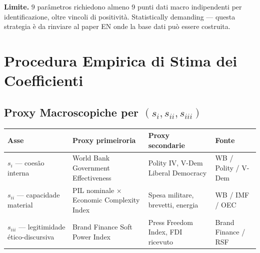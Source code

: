 \Conj{} \textbf{Limite.} \(9\) parâmetros richiedono almeno 9 punti dati
macro indipendenti per identificazione, oltre vincoli di positività.
Statistically demanding --- questa strategia è da rinviare al paper EN
onde la base dati può essere costruita.



\section{Procedura Empirica di Stima dei
Coefficienti}\label{procedura-empirica-di-stima-dei-coefficienti}

\subsection{\texorpdfstring{Proxy Macroscopiche per
\((s_i, s_{ii}, s_{iii})\)}{Proxy Macroscopiche per (s\_i, s\_\{ii\}, s\_\{iii\})}}\label{proxy-macroscopiche-per-s_i-s_ii-s_iii}

{\def\LTcaptype{none} %
{\small\begin{longtable}[]{@{}
  >{\raggedright\arraybackslash}p{}
  >{\raggedright\arraybackslash}p{}
  >{\raggedright\arraybackslash}p{}
  >{\raggedright\arraybackslash}p{}@{}}
\toprule\noalign{}
\begin{minipage}[b]{\linewidth}\raggedright
Asse
\end{minipage} & \begin{minipage}[b]{\linewidth}\raggedright
Proxy primeiroria
\end{minipage} & \begin{minipage}[b]{\linewidth}\raggedright
Proxy secondarie
\end{minipage} & \begin{minipage}[b]{\linewidth}\raggedright
Fonte
\end{minipage} \\
\midrule\noalign{}
\endhead
\bottomrule\noalign{}
\endlastfoot
\(s_i\) --- coesão interna & World Bank Government Effectiveness &
Polity IV, V-Dem Liberal Democracy & WB / Polity / V-Dem \\
\(s_{ii}\) --- capacidade material & PIL nominale $\times$ Economic Complexity
Index & Spesa militare, brevetti, energia & WB / IMF / OEC \\
\(s_{iii}\) --- legitimidade ético-discursiva & Brand Finance Soft Power
Index & Press Freedom Index, FDI ricevuto & Brand Finance / RSF \\
\end{longtable}}
}


